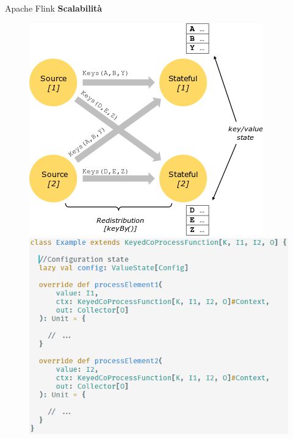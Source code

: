 \documentclass{beamer}
\begin{document}
	\begin{frame}{Apache Flink}
		\textbf{Scalabilità}
		\vspace{.2em}
		\begin{figure}[htb]
    			\begin{minipage}[t]{0.45\textwidth}
    			
       		\centering 
    			\includegraphics[width=1\columnwidth]{../immagini/tecnologieUtilizzate/flink/state_partitioning.png}
    			\end{minipage}
    			\hfill
    			\begin{minipage}[t]{0.45\textwidth}
    				\includegraphics[width=1.25\columnwidth]{../immagini/slide/pfExample.png}
       		\end{minipage}
       		\hspace{1em}
		\end{figure}		
	\end{frame}
	
\end{document}
